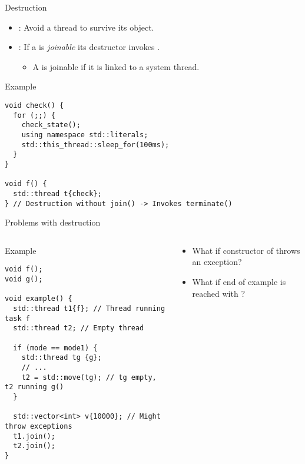 \begin{frame}[t,fragile]{Destruction}
\begin{itemize}
  \item {}: 
        Avoid a thread to survive its  object.
  \item {}: If a  is \emph{joinable} its destructor invokes .
    \begin{itemize}
      \item A  is joinable if it is linked to a system thread.
    \end{itemize}
\end{itemize}
\begin{block}{Example}
\begin{lstlisting}
void check() {
  for (;;) {
    check_state();
    using namespace std::literals;
    std::this_thread::sleep_for(100ms);
  }
}

void f() {
  std::thread t{check};
} // Destruction without join() -> Invokes terminate()
\end{lstlisting}
\end{block}
\end{frame}

\begin{frame}[t,fragile]{Problems with destruction}
\begin{columns}

\begin{column}{.65\textwidth}
\begin{block}{Example}
\begin{lstlisting}
void f();
void g();

void example() {
  std::thread t1{f}; // Thread running task f
  std::thread t2; // Empty thread

  if (mode == mode1) {
    std::thread tg {g}; 
    // ...
    t2 = std::move(tg); // tg empty, t2 running g()
  }

  std::vector<int> v{10000}; // Might throw exceptions
  t1.join();
  t2.join();
}
\end{lstlisting}
\end{block}
\end{column}

\begin{column}{.35\textwidth}
\begin{itemize}
  \item What if constructor of  throws an exception?
  \item What if end of example is reached with ?
\end{itemize}
\end{column}

\end{columns}
\end{frame}

